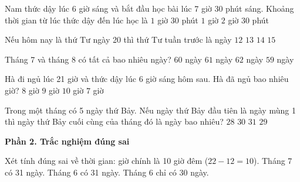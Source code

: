 \begin{ex} %
Nam thức dậy lúc 6 giờ sáng và bắt đầu học bài lúc 7 giờ 30 phút sáng. Khoảng thời gian từ lúc thức dậy đến lúc học là
\choice
{\True $1$ giờ $30$ phút}
{$1$ giờ}
{$2$ giờ}
{$30$ phút}
\end{ex}

\begin{ex} %
Nếu hôm nay là thứ Tư ngày 20 thì thứ Tư tuần trước là ngày
\choice
{$12$}
{\True $13$}
{$14$}
{$15$}
\end{ex}

\begin{ex} %
Tháng 7 và tháng 8 có tất cả bao nhiêu ngày?
\choice
{$60$ ngày}
{$61$ ngày}
{\True $62$ ngày}
{$59$ ngày}
\end{ex}

\begin{ex} %
Hà đi ngủ lúc 21 giờ và thức dậy lúc 6 giờ sáng hôm sau. Hà đã ngủ bao nhiêu giờ?
\choice
{$8$ giờ}
{\True $9$ giờ}
{$10$ giờ}
{$7$ giờ}
\end{ex}

\begin{ex} %
Trong một tháng có 5 ngày thứ Bảy. Nếu ngày thứ Bảy đầu tiên là ngày mùng 1 thì ngày thứ Bảy cuối cùng của tháng đó là ngày bao nhiêu?
\choice
{$28$}
{$30$}
{$31$}
{\True $29$}
\end{ex}

\textbf{Phần 2. Trắc nghiệm đúng sai}

\begin{ex} %
Xét tính đúng sai về thời gian:
\choiceTF
{ giờ chính là 10 giờ đêm ($22 - 12 = 10$).}
{\True Tháng 7 có 31 ngày.}
{Tháng 6 có 31 ngày.}
{\True Tháng 6 chỉ có 30 ngày.}
\end{ex}

